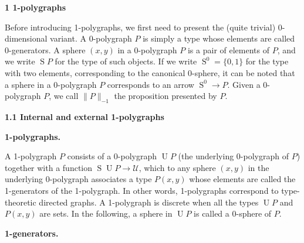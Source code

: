 
 
\par\medskip\noindent\textbf{1 1-polygraphs}\par
 
 
Before introducing 1-polygraphs, we first need to present the (quite trivial) 0-dimensional variant. A 0-polygraph $P$ is simply a type whose elements are called $0$-generators. A sphere $(x,y)$ in a 0-polygraph $P$ is a pair of elements of $P$, and we write $\operatorname{S}P$ for the type of such objects. If we write $\operatorname{S}^{0}=\{0,1\}$ for the type with two elements, corresponding to the canonical 0-sphere, it can be noted that a sphere in a 0-polygraph $P$ corresponds to an arrow $\operatorname{S}^{0}\to P$. Given a $0$-polygraph $P$, we call $\|P\|_{-1}$ the proposition presented by $P$.\par
 
 
 
\par\medskip\noindent\textbf{1.1 Internal and external 1-polygraphs}\par
 
 
\par\medskip\noindent\textbf{1-polygraphs.}\par
 
 
A 1-polygraph $P$ consists of a 0-polygraph $\operatorname{U}P$ (the underlying 0-polygraph of $P$) together with a function $\operatorname{S}{\operatorname{U}P}\to\mathcal{U}$, which to any sphere $(x,y)$ in the underlying 0-polygraph associates a type $P(x,y)$ whose elements are called the 1-generators of the 1-polygraph. In other words, 1-polygraphs correspond to type-theoretic directed graphs. A 1-polygraph is discrete when all the types $\operatorname{U}P$ and $P(x,y)$ are sets. In the following, a sphere in $\operatorname{U}P$ is called a 0-sphere of $P$.\par
 
 
 
 
\par\medskip\noindent\textbf{1-generators.}\par
 
